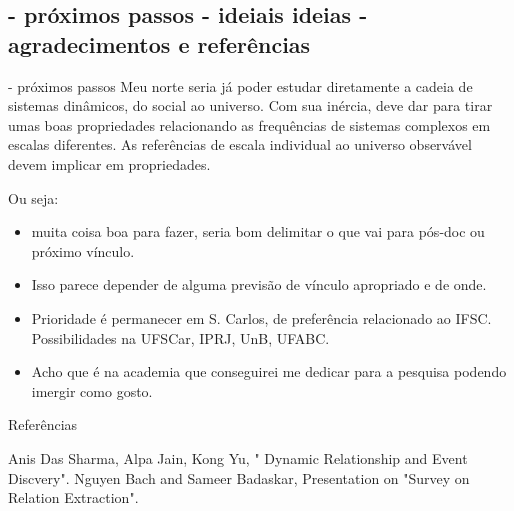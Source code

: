 \documentclass[10pt]{beamer}
\begin{document}
\subsection{- próximos passos \;\; - ideiais ideias \;\; - agradecimentos e referências}
\begin{frame}{- próximos passos}
Meu norte seria já poder estudar diretamente a cadeia de sistemas dinâmicos, do social ao universo. Com sua inércia, deve dar para tirar umas boas propriedades relacionando as frequências de sistemas complexos em escalas diferentes. As referências de escala individual ao universo observável devem implicar em propriedades.

Ou seja:
	\begin{itemize}
		\item muita coisa boa para fazer, seria bom delimitar o que vai para pós-doc ou próximo vínculo.
		\item Isso parece depender de alguma previsão de vínculo apropriado e de onde.
		\item Prioridade é permanecer em S. Carlos, de preferência relacionado ao IFSC. Possibilidades na UFSCar, IPRJ, UnB, UFABC.
		\item Acho que é na academia que conseguirei me dedicar para a pesquisa podendo imergir como gosto.
	\end{itemize}
\end{frame}



\begin{frame}{Referências}
  \begin{thebibliography}{99}
Anis Das Sharma, Alpa Jain, Kong Yu, " Dynamic Relationship and Event Discvery".
Nguyen Bach and Sameer Badaskar, Presentation on "Survey on Relation Extraction".
\end{thebibliography}
\end{frame}

\begin{frame}
\Large
\begin{center}
\end{center}
\end{frame}
\end{document}

